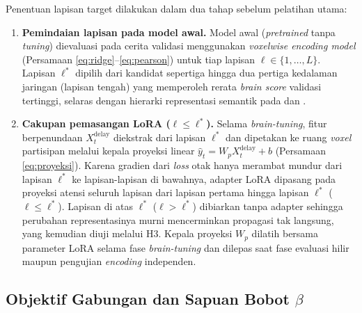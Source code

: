 Penentuan lapisan target dilakukan dalam dua tahap sebelum pelatihan utama:
\begin{enumerate}
  \item \textbf{Pemindaian lapisan pada model awal.} Model awal (\textit{pretrained} tanpa \textit{tuning}) dievaluasi pada cerita validasi menggunakan \textit{voxelwise encoding model} (Persamaan \ref{eq:ridge}--\ref{eq:pearson}) untuk tiap lapisan $\ell \in \{1, \dots, L\}$. Lapisan $\ell^*$ dipilih dari kandidat sepertiga hingga dua pertiga kedalaman jaringan (lapisan tengah) yang memperoleh rerata \textit{brain score} validasi tertinggi, selaras dengan hierarki representasi semantik pada \textcite{mischler2024contextual} dan \textcite{xiao2026beyond}.
  \item \textbf{Cakupan pemasangan LoRA ($\ell \le \ell^*$).} Selama \textit{brain-tuning}, fitur berpenundaan $X_t^{\text{delay}}$ diekstrak dari lapisan $\ell^*$ dan dipetakan ke ruang \textit{voxel} partisipan melalui kepala proyeksi linear $\hat{y}_t = W_p X_t^{\text{delay}} + b$ (Persamaan \ref{eq:proyeksi}). Karena gradien dari \textit{loss} otak hanya merambat mundur dari lapisan $\ell^*$ ke lapisan-lapisan di bawahnya, adapter LoRA dipasang pada proyeksi atensi seluruh lapisan dari lapisan pertama hingga lapisan $\ell^*$ ($\ell \le \ell^*$). Lapisan di atas $\ell^*$ ($\ell > \ell^*$) dibiarkan tanpa adapter sehingga perubahan representasinya murni mencerminkan propagasi tak langsung, yang kemudian diuji melalui H3. Kepala proyeksi $W_p$ dilatih bersama parameter LoRA selama fase \textit{brain-tuning} dan dilepas saat fase evaluasi hilir maupun pengujian \textit{encoding} independen.
\end{enumerate}

\subsection{Objektif Gabungan dan Sapuan Bobot $\beta$}
\label{sub:ds_objektif}

